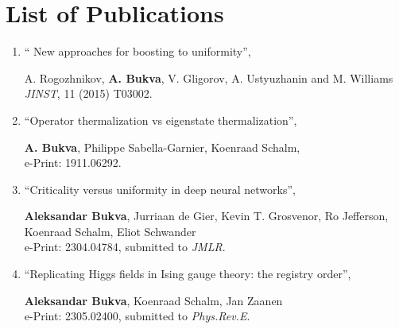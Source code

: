 \newpage
\thispagestyle{empty}

\chapter*{List of Publications}
\label{publications}

\begin{enumerate}[leftmargin=*]
\setlength{\itemsep}{15pt}

    \item   `` New approaches for boosting to uniformity'',
    
         A. Rogozhnikov, \textbf{A. Bukva}, V. Gligorov, A. Ustyuzhanin and M. Williams  \\
         \textit{JINST}, 11 (2015) T03002. 

         
    \item ``Operator thermalization vs eigenstate thermalization'',
    
            \textbf{A. Bukva},  Philippe Sabella-Garnier, Koenraad Schalm, \\
            e-Print: 1911.06292. 

            
    \item ``Criticality versus uniformity in deep neural networks'',

            \textbf{Aleksandar Bukva}, Jurriaan de Gier, Kevin T. Grosvenor, Ro Jefferson, Koenraad Schalm, Eliot Schwander \\
            e-Print: 2304.04784, submitted to \textit{JMLR}.

    \item ``Replicating Higgs fields in Ising gauge theory: the registry order'',

           \textbf{Aleksandar Bukva}, Koenraad Schalm, Jan Zaanen  \\
           e-Print: 2305.02400, submitted to \textit{Phys.Rev.E}.
\end{enumerate}


\newpage
\thispagestyle{empty}